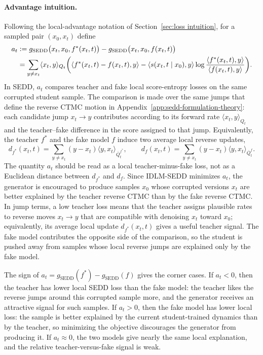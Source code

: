 \paragraph{Advantage intuition.}
Following the local-advantage notation of Section~\ref{sec:loss intuition}, for a sampled pair $(x_0,x_t)$ define
\[
\begin{aligned}
    a_t
    &\vcentcolon=
    g_{\mathrm{SEDD}}\bigl(x_t,x_0,f^*(x_t,t)\bigr)
    -
    g_{\mathrm{SEDD}}\bigl(x_t,x_0,f(x_t,t)\bigr)
    \\
    &=
    \sum_{y\neq x_t}
    \langle x_t,y\rangle_{Q_t}
    \biggl(
    \langle f^*(x_t,t)-f(x_t,t),y\rangle
    -
    \langle s(x_t,t\mid x_0),y\rangle
    \log
    \frac{\langle f^*(x_t,t),y\rangle}
         {\langle f(x_t,t),y\rangle}
    \biggr).
\end{aligned}
\]
In SEDD, $a_t$ compares teacher and fake local score-entropy losses on the same corrupted student sample. The comparison is made over the same jumps that define the reverse CTMC motion in Appendix~\ref{app:sedd-formulation-theory}: each candidate jump $x_t\to y$ contributes according to its forward rate $\langle x_t,y\rangle_{Q_t}$ and the teacher--fake difference in the score assigned to that jump. Equivalently, the teacher $f^*$ and the fake model $f$ induce two average local reverse updates,
\[
    d_{f^*}(x_t,t)
    =
    \sum_{y\neq x_t}
    (y-x_t)\langle y,x_t\rangle_{\overline Q_t^{f^*}},
    \qquad
    d_f(x_t,t)
    =
    \sum_{y\neq x_t}
    (y-x_t)\langle y,x_t\rangle_{\overline Q_t^f}.
\]
The quantity $a_t$ should be read as a local teacher-minus-fake loss, not as a Euclidean distance between $d_{f^*}$ and $d_f$. Since IDLM-SEDD minimizes $a_t$, the generator is encouraged to produce samples $x_0$ whose corrupted versions $x_t$ are better explained by the teacher reverse CTMC than by the fake reverse CTMC. In jump terms, a low teacher loss means that the teacher assigns plausible rates to reverse moves $x_t\to y$ that are compatible with denoising $x_t$ toward $x_0$; equivalently, its average local update $d_{f^*}(x_t,t)$ gives a useful teacher signal. The fake model contributes the opposite side of the comparison, so the student is pushed away from samples whose local reverse jumps are explained only by the fake model.

The sign of $a_t=g_{\mathrm{SEDD}}(f^*)-g_{\mathrm{SEDD}}(f)$ gives the corner cases. If $a_t<0$, then the teacher has lower local SEDD loss than the fake model: the teacher likes the reverse jumps around this corrupted sample more, and the generator receives an attractive signal for such samples. If $a_t>0$, then the fake model has lower local loss: the sample is better explained by the current student-trained dynamics than by the teacher, so minimizing the objective discourages the generator from producing it. If $a_t\approx0$, the two models give nearly the same local explanation, and the relative teacher-versus-fake signal is weak.

